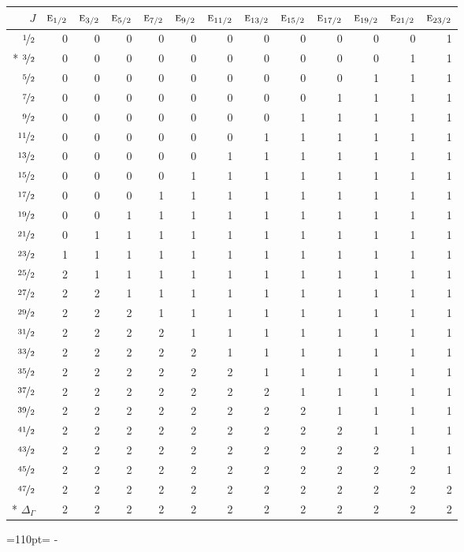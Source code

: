 \documentclass[10pt,a4paper]{article}
\makeatletter
\def\grouprule#1#2{\noalign{\marks\LTgroupmarks{\the\belowrulesep}\nobreak\vskip#1%
  \vskip\aboverulesep}\multispan\LT@cols\unskip{\leaders\hrule\@height#2\hfill\kern\z@}\cr
  \noalign{\penalty\LTrulebreak\vskip\belowrulesep\global\@lastruleclass\z@}}
\newcommand{\needspace}[1]{\par\penalty-100\begingroup\dimen0=#1\relax\dimen2=\pagegoal
  \advance\dimen2-\pagetotal\ifdim\dimen0>\dimen2\relax\ifdim\dimen2>0pt\vfil\break\fi\fi
  \endgroup}
\numberwithin{equation}{section}
\newcommand{\irr}[1]{\text{\normalfont\scshape #1}}
\makeatother
\begin{document}
{\small\begin{longtable}{@{}rrrrrrrrrrrrr@{}}\toprule
$J$ & $\irr{e}_{1/2}$ & $\irr{e}_{3/2}$ & $\irr{e}_{5/2}$ & $\irr{e}_{7/2}$ & $\irr{e}_{9/2}$ & $\irr{e}_{11/2}$ & $\irr{e}_{13/2}$ & $\irr{e}_{15/2}$ & $\irr{e}_{17/2}$ & $\irr{e}_{19/2}$ & $\irr{e}_{21/2}$ & $\irr{e}_{23/2}$\\\midrule\endhead
\bottomrule\endfoot\endlastfoot
$\nicefrac{1}{2}$ & 0 & 0 & 0 & 0 & 0 & 0 & 0 & 0 & 0 & 0 & 0 & 1\\*
$\nicefrac{3}{2}$ & 0 & 0 & 0 & 0 & 0 & 0 & 0 & 0 & 0 & 0 & 1 & 1\\
$\nicefrac{5}{2}$ & 0 & 0 & 0 & 0 & 0 & 0 & 0 & 0 & 0 & 1 & 1 & 1\\
$\nicefrac{7}{2}$ & 0 & 0 & 0 & 0 & 0 & 0 & 0 & 0 & 1 & 1 & 1 & 1\\
$\nicefrac{9}{2}$ & 0 & 0 & 0 & 0 & 0 & 0 & 0 & 1 & 1 & 1 & 1 & 1\\
$\nicefrac{11}{2}$ & 0 & 0 & 0 & 0 & 0 & 0 & 1 & 1 & 1 & 1 & 1 & 1\\
$\nicefrac{13}{2}$ & 0 & 0 & 0 & 0 & 0 & 1 & 1 & 1 & 1 & 1 & 1 & 1\\
$\nicefrac{15}{2}$ & 0 & 0 & 0 & 0 & 1 & 1 & 1 & 1 & 1 & 1 & 1 & 1\\
$\nicefrac{17}{2}$ & 0 & 0 & 0 & 1 & 1 & 1 & 1 & 1 & 1 & 1 & 1 & 1\\
$\nicefrac{19}{2}$ & 0 & 0 & 1 & 1 & 1 & 1 & 1 & 1 & 1 & 1 & 1 & 1\\
$\nicefrac{21}{2}$ & 0 & 1 & 1 & 1 & 1 & 1 & 1 & 1 & 1 & 1 & 1 & 1\\
$\nicefrac{23}{2}$ & 1 & 1 & 1 & 1 & 1 & 1 & 1 & 1 & 1 & 1 & 1 & 1\\
$\nicefrac{25}{2}$ & 2 & 1 & 1 & 1 & 1 & 1 & 1 & 1 & 1 & 1 & 1 & 1\\
$\nicefrac{27}{2}$ & 2 & 2 & 1 & 1 & 1 & 1 & 1 & 1 & 1 & 1 & 1 & 1\\
$\nicefrac{29}{2}$ & 2 & 2 & 2 & 1 & 1 & 1 & 1 & 1 & 1 & 1 & 1 & 1\\
$\nicefrac{31}{2}$ & 2 & 2 & 2 & 2 & 1 & 1 & 1 & 1 & 1 & 1 & 1 & 1\\
$\nicefrac{33}{2}$ & 2 & 2 & 2 & 2 & 2 & 1 & 1 & 1 & 1 & 1 & 1 & 1\\
$\nicefrac{35}{2}$ & 2 & 2 & 2 & 2 & 2 & 2 & 1 & 1 & 1 & 1 & 1 & 1\\
$\nicefrac{37}{2}$ & 2 & 2 & 2 & 2 & 2 & 2 & 2 & 1 & 1 & 1 & 1 & 1\\
$\nicefrac{39}{2}$ & 2 & 2 & 2 & 2 & 2 & 2 & 2 & 2 & 1 & 1 & 1 & 1\\
$\nicefrac{41}{2}$ & 2 & 2 & 2 & 2 & 2 & 2 & 2 & 2 & 2 & 1 & 1 & 1\\
$\nicefrac{43}{2}$ & 2 & 2 & 2 & 2 & 2 & 2 & 2 & 2 & 2 & 2 & 1 & 1\\
$\nicefrac{45}{2}$ & 2 & 2 & 2 & 2 & 2 & 2 & 2 & 2 & 2 & 2 & 2 & 1\\
$\nicefrac{47}{2}$ & 2 & 2 & 2 & 2 & 2 & 2 & 2 & 2 & 2 & 2 & 2 & 2\\*
\grouprule{0pt}{\lightrulewidth} $\Delta_\Gamma$ & 2 & 2 & 2 & 2 & 2 & 2 & 2 & 2 & 2 & 2 & 2 & 2\\
\bottomrule\end{longtable}}
\needspace{110pt}
\end{document}
